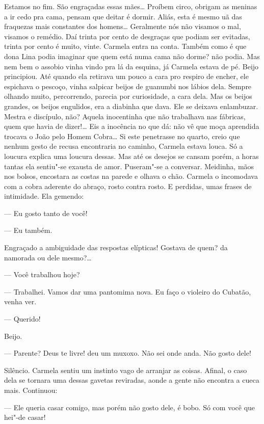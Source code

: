 Estamos no fim. São engraçadas essas mães\ldots{} Proíbem circo, obrigam as
meninas a ir cedo pra cama, pensam que deitar é dormir. Aliás, esta é
mesmo uã das fraquezas mais constantes dos homens\ldots{} Geralmente nós não
visamos o mal, visamos o remédio. Daí trinta por cento de desgraças que
podiam ser evitadas, trinta por cento é muito, vinte. Carmela entra na
conta. Também como é que dona Lina podia imaginar que quem está numa
cama não dorme? não podia. Mas nem bem o assobio vinha vindo pra lá da
esquina, já Carmela estava de pé. Beijo principiou. Até quando ela
retirava um pouco a cara pro respiro de encher, ele espichava o pescoço,
vinha salpicar beijos de guanumbi nos lábios dela. Sempre olhando muito,
percorrendo, parecia por curiosidade, a cara dela. Mas os beijos
grandes, os beijos engulidos, era a diabinha que dava. Ele se deixava
enlambuzar. Mestra e discípulo, não? Aquela inocentinha que não
trabalhava nas fábricas, quem que havia de dizer!\ldots{} Eis a inocência no
que dá: não vê que moça aprendida trocava o João pelo Homem Cobra\ldots{} Si
este penetrasse no quarto, creio que nenhum gesto de recusa encontraria
no caminho, Carmela estava louca. Só a loucura explica uma loucura
dessas. Mas até os desejos se cansam porém, a horas tantas ela sentiu"-se
exausta de amor. Puseram"-se a conversar. Meidinha, mãos nos bolsos,
encostara as costas na parede e olhava o chão. Carmela o incomodava com
a cobra aderente do abraço, rosto contra rosto. E perdidas, umas frases
de intimidade. Ela gemendo:

--- Eu gosto tanto de você!

--- Eu também.

Engraçado a ambiguidade das respostas elípticas! Gostava de quem? da
namorada ou dele mesmo?\ldots{}

--- Você trabalhou hoje?

--- Trabalhei. Vamos dar uma pantomima nova. Eu faço o violeiro do
Cubatão, venha ver.

--- Querido!

Beijo.


--- Parente? Deus te livre! deu um muxoxo. Não sei onde anda. Não gosto
dele!

Silêncio. Carmela sentiu um instinto vago de arranjar as coisas. Afinal,
o caso dela se tornara uma dessas gavetas reviradas, aonde a gente não
encontra a cueca mais. Continuou:

--- Ele queria casar comigo, mas porém não gosto dele, é bobo. Só com
você que hei"-de casar!

